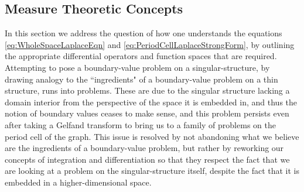 \subsection{Measure Theoretic Concepts} \label{ssec:MeasureTheory}
In this section we address the question of how one understands the equations \eqref{eq:WholeSpaceLaplaceEqn} and \eqref{eq:PeriodCellLaplaceStrongForm}, by outlining the appropriate differential operators and function spaces that are required.
Attempting to pose a boundary-value problem on a singular-structure, by drawing analogy to the ``ingredients" of a boundary-value problem on a thin structure, runs into problems.
These are due to the singular structure lacking a domain interior from the perspective of the space it is embedded in, and thus the notion of boundary values ceases to make sense, and this problem persists even after taking a Gelfand transform to bring us to a family of problems on the period cell of the graph.
This issue is resolved by not abandoning what we believe are the ingredients of a boundary-value problem, but rather by reworking our concepts of integration and differentiation so that they respect the fact that we are looking at a problem on the singular-structure itself, despite the fact that it is embedded in a higher-dimensional space. 

